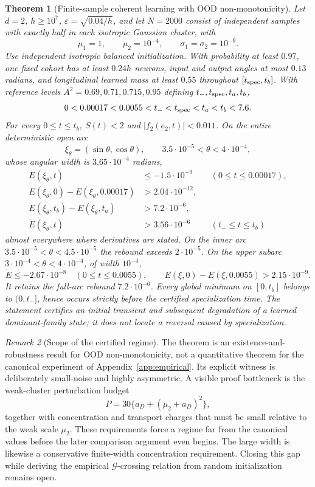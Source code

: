\documentclass[10pt]{article}
\newtheorem{theorem}{Theorem}[section]
\theoremstyle{remark}\newtheorem{remark}[theorem]{Remark}
\begin{document}
\begin{theorem}[Finite-sample coherent learning with OOD non-monotonicity]
\label{sbsharp:theorem}
Let $d=2$, $h\ge10^7$, $\varepsilon=\sqrt{0.04/h}$, and let $N=2000$
consist of independent samples with exactly half in each isotropic
Gaussian cluster, with
\[
 \mu_1=1,\qquad\mu_2=10^{-4},\qquad\sigma_1=\sigma_2=10^{-9}.
\]
Use independent isotropic balanced initialization. With probability at
least $0.97$, one fixed cohort has at least $0.24h$ neurons, input and
output angles at most $0.13$ radians, and longitudinal learned mass at
least $0.55$ throughout $[t_{\rm spec},t_b]$. With reference levels
$A^2=0.69,0.71,0.715,0.95$ defining $t_-,t_{\rm spec},t_a,t_b$,
\[
 0<0.00017<0.0055<t_-<t_{\rm spec}<t_a<t_b<7.6.
\]
For every $0\le t\le t_b$, $S(t)<2$ and $|f_2(e_2,t)|<0.011$.
On the entire deterministic open arc
\[
 \xi_\theta=(\sin\theta,\cos\theta),\qquad
 3.5\cdot10^{-5}<\theta<4\cdot10^{-4},
\]
whose angular width is $3.65\cdot10^{-4}$ radians,
\begin{align*}
 \dot E(\xi_\theta,t)&\le-1.5\cdot10^{-9}
                         &&(0\le t\le0.00017),\\
 E(\xi_\theta,0)-E(\xi_\theta,0.00017)&>2.04\cdot10^{-12},\\
 E(\xi_\theta,t_b)-E(\xi_\theta,t_a)&>7.2\cdot10^{-6},\\
 \dot E(\xi_\theta,t)&>3.56\cdot10^{-6}
                         &&(t_-\le t\le t_b)
\end{align*}
almost everywhere where derivatives are stated. On the inner arc
$3.5\cdot10^{-5}<\theta<4.5\cdot10^{-5}$ the rebound exceeds
$2\cdot10^{-5}$. On the upper subarc
$3\cdot10^{-4}<\theta<4\cdot10^{-4}$, of width $10^{-4}$,
\[
 \dot E\le-2.67\cdot10^{-8}\quad(0\le t\le0.0055),\qquad
 E(\xi,0)-E(\xi,0.0055)>2.15\cdot10^{-9}.
\]
It retains the full-arc rebound $7.2\cdot10^{-6}$.
Every global minimum
on $[0,t_b]$ belongs to $(0,t_-]$, hence occurs strictly before the
certified specialization time. The statement certifies an initial
transient and subsequent degradation of a learned dominant-family state;
it does not locate a reversal caused by specialization.
\end{theorem}

\begin{remark}[Scope of the certified regime]
The theorem is an existence-and-robustness result for OOD non-monotonicity,
not a quantitative theorem for the canonical experiment of
Appendix~\ref{app:empirical}. Its explicit witness is deliberately
small-noise and highly asymmetric. A visible proof bottleneck is the
weak-cluster perturbation budget
\[
 P=30\{a_D+(\mu_2+a_D)^2\},
\]
together with concentration and transport charges that must be small
relative to the weak scale $\mu_2$. These requirements force a regime far
from the canonical values before the later comparison argument even begins.
The large width is likewise a conservative finite-width concentration
requirement. Closing this gap while deriving the empirical
$\mathcal G$-crossing relation from random initialization remains open.
\end{remark}
\end{document}
